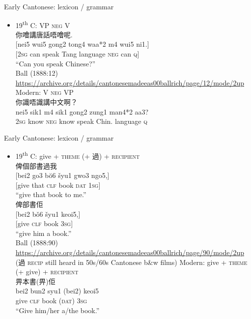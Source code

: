 \documentclass{beamer}
\begin{document}
\begin{frame}[fragile]{Early Cantonese: lexicon / grammar}

\begin{itemize}
    \item 19\textsuperscript{th} C: VP \textsc{neg} V\\
    \smallskip
    {\footnotesize 你噲講唐話唔噲呢.\\
    {[nei5 wui5 gong2 tong4 waa*2 m4 wui5 ni1.]}\\
    {[\textsc{2sg} can speak Tang language \textsc{neg} can \textsc{q}]}\\
    \enquote{Can you speak Chinese?}}\\
    {\tiny Ball (1888:12) \url{https://archive.org/details/cantonesemadeeas00ballrich/page/12/mode/2up}}\\
    \smallskip
    Modern: V \textsc{neg} VP\\
    {\footnotesize 你識唔識講中文啊？\\
    nei5 sik1 m4 sik1 gong2 zung1 man4*2 aa3?\\
    \textsc{2sg} know \textsc{neg} know speak Chin. language \textsc{q}\\
    }
\end{itemize}

\end{frame}

\begin{frame}[fragile]{Early Cantonese: lexicon / grammar}

\begin{itemize}
    \smallskip
    \item 19\textsuperscript{th} C: give + \textsc{theme} (+ 過) + \textsc{recipient}\\
    {\footnotesize 俾個部書過我\\
    {[bei2 go3 bŏ6 šyu1 gwo3 ngo5,]}\\
    {[give that \textsc{clf} book \textsc{dat} \textsc{1sg}]}\\
    \enquote{give that book to me.}\\
    俾部書佢\\
    {[bei2 bǒ6 šyu1 keoi5,]}\\
    {[give \textsc{clf} book \textsc{3sg}]}\\
    \enquote{give him a book.}}\\
    {\tiny Ball (1888:90) \url{https://archive.org/details/cantonesemadeeas00ballrich/page/90/mode/2up}}\\
    \smallskip
    (過 \textsc{recip} still heard in 50s/60s Cantonese b\&w films)
    \medskip
    Modern: give + \textsc{theme} (+ give) + \textsc{recipient}\\
    {\footnotesize 畀本書(畀)佢\\
    bei2 bun2 syu1 (bei2) keoi5\\
    give \textsc{clf} book (\textsc{dat}) \textsc{3sg}\\
    \enquote{Give him/her a/the book.}
    }
\end{itemize}

\end{frame}
\end{document}
